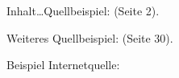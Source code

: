 
\setcounter{page}{1}

Inhalt\ldots Quellbeispiel: \cite{Plenk2019} (Seite 2).

Weiteres Quellbeispiel: \cite{Siemens} (Seite 30).

Beispiel Internetquelle: \cite{Siemens2023}
